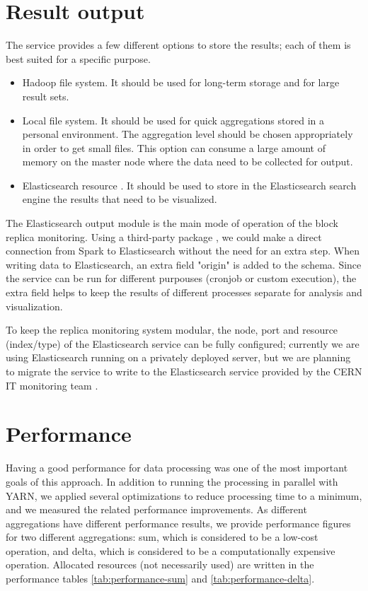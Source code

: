 \documentclass[a4paper]{jpconf}
\begin{document}
\section{Result output}

The service provides a few different options to store the results; each of them is best suited for a specific purpose.
\begin{itemize}
\item Hadoop file system. It should be used for long-term storage and for large result sets.
\item Local file system. It should be used for quick aggregations stored in a personal environment. The aggregation level should be chosen appropriately in order to get small files. This option can consume a large amount of memory on the master node where the data need to be collected for output.
\item Elasticsearch resource \cite{Elasticsearch}. It should be used to store in the Elasticsearch search engine the results that need to be visualized.
\end{itemize}

The Elasticsearch output module is the main mode of operation of the block replica monitoring. 
Using a third-party package \cite{Elasticsearchspark}, we could make a direct connection from Spark to Elasticsearch without the need for an extra step. When writing data to Elasticsearch, an extra field "origin" is added to the schema. Since the service can be run for different purpouses (cronjob or custom execution), the extra field helps to keep the results of different processes separate for analysis and visualization.


To keep the replica monitoring system modular, the node, port and resource (index/type) of the Elasticsearch service can be fully configured; currently we are using Elasticsearch running on a privately deployed server, but we are planning to migrate the service to write to the Elasticsearch service provided by the CERN IT monitoring team \cite{itmon}.

\section{Performance}

Having a good performance for data processing was one of the most important goals of this approach. In addition to running the processing in parallel with YARN, we applied several optimizations to reduce processing time to a minimum, and we measured the related performance improvements. As different aggregations have different performance results, we provide performance figures for two different aggregations: sum, which is considered to be a low-cost operation, and delta, which is 
considered to be a computationally expensive operation. Allocated resources (not necessarily used) are written in the 
performance tables \ref{tab:performance-sum} and \ref{tab:performance-delta}.
\end{document}
